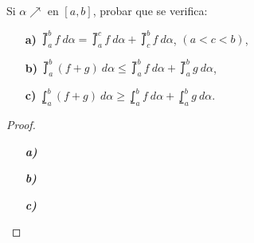 \setcounter{section}{7}
\setcounter{exercise}{10}

\begin{exercise}

Si $\alpha \nearrow$ en $\left[a,b\right]$, probar que se verifica:

\begin{itemize}
  \item[\textbf{a)}]$\upint_{a}^{b} f\ d\alpha = \upint_a^c f\ d\alpha + \upint_c^b f\ d\alpha$, $\left(a<c<b\right)$,
  \item[\textbf{b)}]$\upint_{a}^{b} \left(f+g\right)\ d\alpha \leq \upint_{a}^{b} f\ d\alpha + \upint_{a}^{b} g\ d\alpha$,
  \item[\textbf{c)}]$\lowint_{a}^{b} \left(f+g\right)\ d\alpha \geq \lowint_{a}^{b} f\ d\alpha + \lowint_{a}^{b} g\ d\alpha$.
\end{itemize}

\end{exercise}

\begin{proof}

\begin{itemize}
  \item[\textbf{\textit{a)}}]
  \item[\textbf{\textit{b)}}]
  \item[\textbf{\textit{c)}}]
\end{itemize}

\end{proof}

